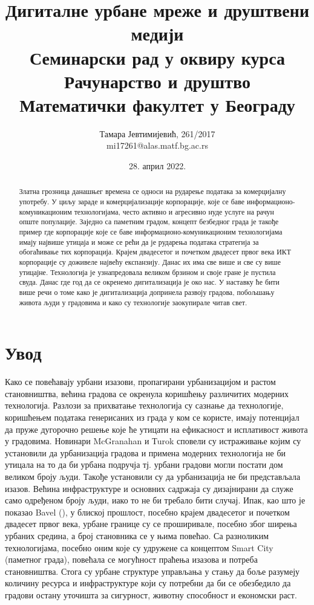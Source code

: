 \documentclass{article}
\title{Дигиталне урбане мреже и друштвени медији\\
\small{Семинарски рад у оквиру курса\\Рачунарство и друштво \\
        Математички факултет у Београду}}
\author{Тамара Јевтимијевић, 261/2017\\mi17261@alas.matf.bg.ac.rs}
\date{28. април 2022.}
\begin{document}
\maketitle

\begin{abstract}
Златна грозница данашњег времена се односи на
рударење података за комерцијалну употребу. У циљу зараде и комерцијализације
корпорације, које се баве информационо-комуникационим технологијама, често активно и агресивно нуде услуге на рачун опште популације. Заједно са паметним градом, концепт безбедног града је такође пример где корпорације које се баве информационо-комуникационим технологијама имају највише утицаја и може се рећи да је рударења података стратегија за обогаћивање тих корпорација. Крајем двадесетог и почетком двадесет првог века ИКТ корпорације су доживеле највећу експанзију. Данас их има све више и све су више утицајне. Технологија је узнапредовала великом брзином и своје гране је пустила свуда. Данас где год да се окренемо дигитализација је око нас. У наставку ће бити више речи о томе како је дигитализација допринела развоју градова, побољшању живота људи у градовима и како су технологије заокупирале читав свет.
\end{abstract}

\newpage
\tableofcontents

\newpage
\section{Увод}

Како се повећавају урбани изазови, пропагирани урбанизацијом и растом становништва, већина градова се окренула коришћењу различитих модерних технологија. Разлози за прихватање технологија су сазнање да технологије, коришћењем података генерисаних из града у ком се користе, имају потенцијал да пруже дугорочно решење које ће утицати на ефикасност и исплативост живота у градовима. Новинари McGranahan и Тurok \cite{2013} сповели су истраживање којим су установили да урбанизација градова и примена модерних технологија не би утицала на то да би урбана подручја тј. урбани градови могли постати дом великом броју људи. Такође установили су да урбанизација не би представљала изазов. Већина инфраструктуре и основних садржаја су дизајнирани да служе само одређеном броју људи, иако то не би требало бити случај. Ипак, као што је показао Bavel (\cite{b_2013}), у блиској прошлост, посебно крајем двадесетог и почетком двадесет првог века, урбане границе су се проширивале, посебно због ширења урбаних средина, а број становника се у њима повећао. Са разноликим технологијама, посебно оним које су удружене са концептом Smart City (паметног града), повећала се могућност праћења изазова и потреба становништва. Стога су урбане структуре управљања у стању да боље разумеју количину ресурса и инфраструктуре који су потребни да би се обезбедило да градови остану уточишта за сигурност, животну способност и економски раст.
\end{document}
